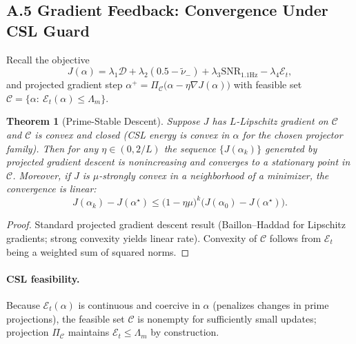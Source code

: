 \documentclass[11pt]{article}
\newtheorem{theorem}{Theorem}
\begin{document}
\subsection*{A.5 Gradient Feedback: Convergence Under CSL Guard}
Recall the objective
\[
J(\alpha)=\lambda_1 \mathcal D + \lambda_2(0.5-\tilde\nu_-) + \lambda_3 \mathrm{SNR}_{1.1\mathrm{Hz}} - \lambda_4 \mathcal E_t,
\]
and projected gradient step $\alpha^{+}=\Pi_{\mathcal C}\big(\alpha - \eta \nabla J(\alpha)\big)$ with feasible set $\mathcal C=\{\alpha:\ \mathcal E_t(\alpha)\le \Lambda_m\}$.

\begin{theorem}[Prime-Stable Descent]
\label{thm:descent}
Suppose $J$ has $L$-Lipschitz gradient on $\mathcal C$ and $\mathcal C$ is convex and closed (CSL energy is convex in $\alpha$ for the chosen projector family). Then for any $\eta\in(0,2/L)$ the sequence $\{J(\alpha_k)\}$ generated by projected gradient descent is nonincreasing and converges to a stationary point in $\mathcal C$. Moreover, if $J$ is $\mu$-strongly convex in a neighborhood of a minimizer, the convergence is linear:
\[
J(\alpha_k)-J(\alpha^\star) \le \Big(1-\eta\mu\Big)^k\big(J(\alpha_0)-J(\alpha^\star)\big).
\]
\end{theorem}
\begin{proof}
Standard projected gradient descent result (Baillon–Haddad for Lipschitz gradients; strong convexity yields linear rate). Convexity of $\mathcal C$ follows from $\mathcal E_t$ being a weighted sum of squared norms.
\end{proof}

\paragraph{CSL feasibility.}
Because $\mathcal E_t(\alpha)$ is continuous and coercive in $\alpha$ (penalizes changes in prime projections), the feasible set $\mathcal C$ is nonempty for sufficiently small updates; projection $\Pi_{\mathcal C}$ maintains $\mathcal E_t\le\Lambda_m$ by construction.

\end{document}
